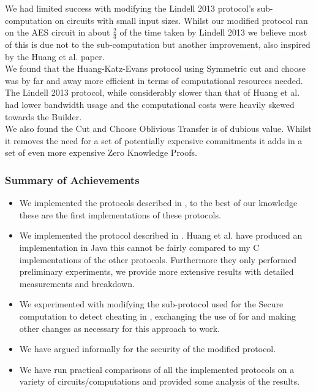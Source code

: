 \documentclass[ %
                    author={Nicholas Tutte},
                supervisor={Prof. Nigel Smart},
                    degree={MEng},
                     title={Secure Two Party Computation},
                  subtitle={A practical comparison of recent protocols},
                      type={Research - GG1K},
                      year={2015} ]{dissertation}
\begin{document}
			  We had limited success with modifying the Lindell 2013 protocol's sub-computation on circuits with small input sizes. Whilst our modified protocol ran on the AES circuit in about $\frac{2}{3}$ of the time taken by Lindell 2013 we believe most of this is due not to the sub-computation but another improvement, also inspired by the Huang et al. paper.\\

			  We found that the Huang-Katz-Evans protocol using Symmetric cut and choose was by far and away more efficient in terms of computational resources needed. The Lindell 2013 protocol, while considerably slower than that of Huang et al. had lower bandwidth usage and the computational costs were heavily skewed towards the Builder.\\

			  We also found the Cut and Choose Oblivious Transfer is of dubious value. Whilst it removes the need for a set of potentially expensive commitments it adds in a set of even more expensive Zero Knowledge Proofs. 


			\subsubsection*{Summary of Achievements}
				\begin{itemize}
					\item We implemented the protocols described in \cite{LindellAndPinkas2011, Lindell_CnC_2013}, to the best of our knowledge these are the first implementations of these protocols.
					\item We implemented the protocol described in \cite{Katz_Symm_CnC_2013}. Huang et al. have produced an implementation in Java this cannot be fairly compared to my C implementations of the other protocols. Furthermore they only performed preliminary experiments, we provide more extensive results with detailed measurements and breakdown.
					\item We experimented with modifying the sub-protocol used for the Secure computation to detect cheating in \cite{Lindell_CnC_2013}, exchanging the use of \cite{LindellAndPinkas2011} for \cite{Katz_Symm_CnC_2013} and making other changes as necessary for this approach to work.
					\item We have argued informally for the security of the modified protocol.
					\item We have run practical comparisons of all the implemented protocols on a variety of circuits/computations and provided some analysis of the results.
				\end{itemize}
\end{document}
